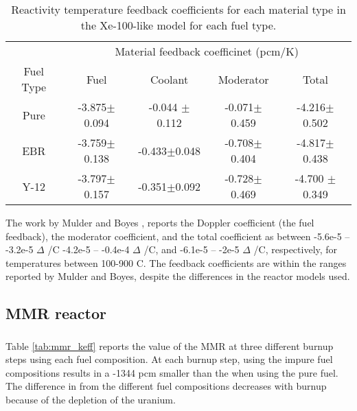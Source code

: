 \begin{table}
        \centering
        \caption{Reactivity temperature feedback coefficients for 
        each material type in the Xe-100-like model for each fuel 
        type.}
        \label{tab:coeff_xe100}
        \begin{tabular}{c c c c c}
            \hline 
            & \multicolumn{4}{c}{Material feedback coefficinet (pcm/K)} \\
            Fuel Type & Fuel & Coolant & Moderator & Total \\
            \hline
            Pure & -3.875$\pm$0.094 & -0.044 $\pm$ 0.112 & -0.071$\pm$0.459 & -4.216$\pm$0.502\\
            \gls{EBR} & -3.759$\pm$0.138 & -0.433$\pm$0.048 & -0.708$\pm$0.404 & -4.817$\pm$0.438\\
            Y-12 & -3.797$\pm$0.157 & -0.351$\pm$0.092 & -0.728$\pm$0.469 & -4.700 $\pm$0.349\\
            \hline

        \end{tabular}
\end{table}
The work by Mulder and Boyes \cite{mulder_neutronics_2020}, reports 
the Doppler coefficient (the fuel feedback), the moderator coefficient, 
and the total coefficient as between -5.6e-5 -- -3.2e-5 $\Delta$ 
\keff/\textdegree C
-4.2e-5 -- -0.4e-4 $\Delta$ \keff/\textdegree C, and -6.1e-5 -- -2e-5 
$\Delta$ \keff/\textdegree C, respectively, for temperatures between 100-900
\textdegree C. The feedback coefficients are within the ranges reported 
by Mulder and Boyes, despite the differences in the reactor models used. 

\subsection{MMR reactor}

\subsubsection{\keff}

Table \ref{tab:mmr_keff} reports the \keff value of the \gls{MMR} at three 
different burnup steps using each fuel composition. At each burnup step, 
using the impure fuel compositions results in a -1344 pcm 
smaller than the \keff when using the pure fuel. The difference in \keff 
from the different fuel compositions decreases with burnup because of 
the depletion of the uranium. 

